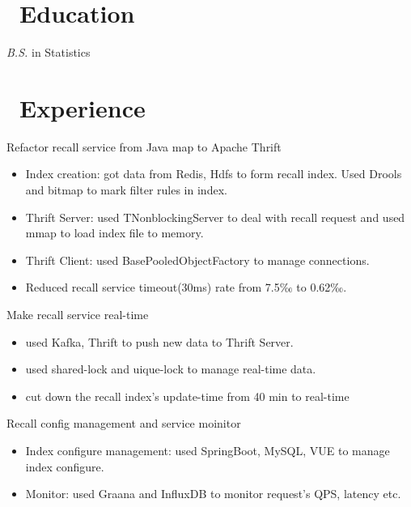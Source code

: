 \documentclass{resume}
\begin{document}



\section{\faGraduationCap\ Education}
\textit{B.S.} in Statistics

\section{\faUsers\ Experience}
Refactor recall service from Java map to Apache Thrift
\begin{itemize}
  \item Index creation: got data from Redis, Hdfs to form recall index. Used Drools and bitmap to mark filter rules in index.
  \item Thrift Server: used TNonblockingServer to deal with recall request and used mmap to load index file to memory.
  \item Thrift Client: used BasePooledObjectFactory to manage connections.
  \item Reduced recall service timeout(30ms) rate from 7.5‰ to 0.62‰.
\end{itemize}

Make recall service real-time
\begin{itemize}
  \item used Kafka, Thrift to push new data to Thrift Server.
  \item used shared-lock and uique-lock to manage real-time data.
  \item cut down the recall index's update-time from 40 min to real-time
\end{itemize}

Recall config management and service moinitor
\begin{itemize}
  \item Index configure management: used SpringBoot, MySQL, VUE to manage index configure.
  \item Monitor: used Graana and InfluxDB to monitor request's QPS, latency etc.
\end{itemize}
\end{document}
